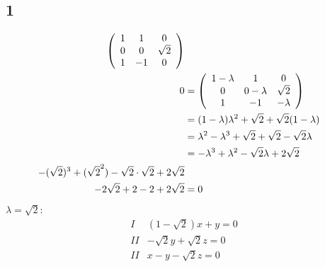 \documentclass{article}
\begin{document}
\subsection*{1}
\begin{align*}
    \left(\begin{array}{c c c}
        1&1&0\\0&0&\sqrt{2}\\1&-1&0
    \end{array}\right)\\
    0&=\left(\begin{array}{c c c}
        1-\lambda&1&0\\0&0-\lambda&\sqrt{2}\\1&-1&-\lambda
    \end{array}\right)\\
    &= (1-\lambda)\lambda^2+\sqrt{2}+\sqrt{2}(1-\lambda)\\
    &= \lambda^2-\lambda^3+\sqrt{2}+\sqrt{2}-\sqrt{2}\lambda\\
    &= -\lambda^3+\lambda^2-\sqrt{2}\lambda+2\sqrt{2}\\
    -(\sqrt{2})^3+(\sqrt{2}^2)-\sqrt{2}\cdot\sqrt{2}+2\sqrt{2}\\
    -2\sqrt{2}+2-2+2\sqrt{2}&=0\\
\end{align*}
$\lambda =\sqrt{2}$:
\begin{align*}
    I &(1-\sqrt{2})x+y=0\\
    II &-\sqrt{2}y+\sqrt{2}z=0\\
    II &x-y-\sqrt{2}z=0
\end{align*}
\end{document}
